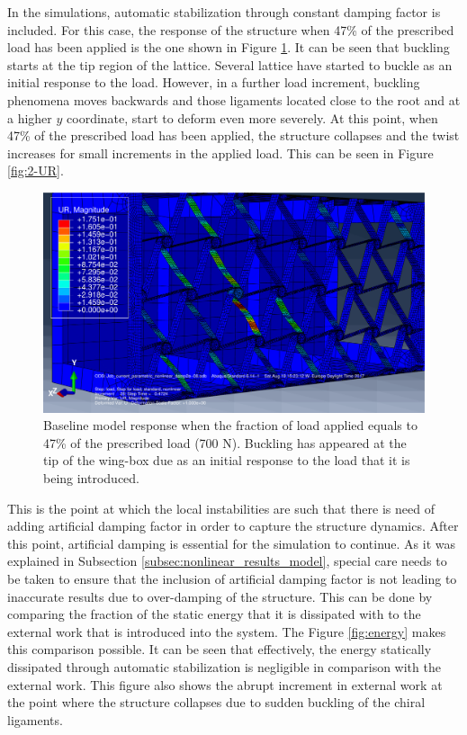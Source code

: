   In the simulations, automatic stabilization through constant damping factor is included. For this case, the response of the structure when 47\% of the prescribed load has been applied is the one shown in Figure \ref{fig:1-UR}. It can be seen that buckling starts at the tip region of the lattice. Several lattice have started to buckle as an initial response to the load. However, in a further load increment, buckling phenomena moves backwards and those ligaments located close to the root and at a higher $y$ coordinate, start to deform even more severely. At this point, when 47\% of the prescribed load has been applied, the structure collapses and the twist increases for small increments in the applied load. This can be seen in Figure \ref{fig:2-UR}.

  \begin{figure}[!htpb] %
    \centering
    \includegraphics[width=0.8 \textwidth]{figures/result-sim/1-UR}
    \caption[Baseline model response when the fraction of load applied equals to 47\% of the prescribed load (700 N)]{Baseline model response when the fraction of load applied equals to 47\% of the prescribed load (700 N). Buckling has appeared at the tip of the wing-box due as an initial response to the load that it is being introduced.}\label{fig:1-UR}
  \end{figure}

  This is the point at which the local instabilities are such that there is need of adding artificial damping factor in order to capture the structure dynamics. After this point, artificial damping is essential for the simulation to continue. As it was explained in Subsection \ref{subsec:nonlinear_results_model}, special care needs to be taken to ensure that the inclusion of artificial damping factor is not leading to inaccurate results due to over-damping of the structure. This can be done by comparing the fraction of the static energy that it is dissipated with to the external work that is introduced into the system. The Figure \ref{fig:energy} makes this comparison possible. It can be seen that effectively, the energy statically dissipated through automatic stabilization is negligible in comparison with the external work. This figure also shows the abrupt increment in external work at the point where the structure collapses due to sudden buckling of the chiral ligaments.

